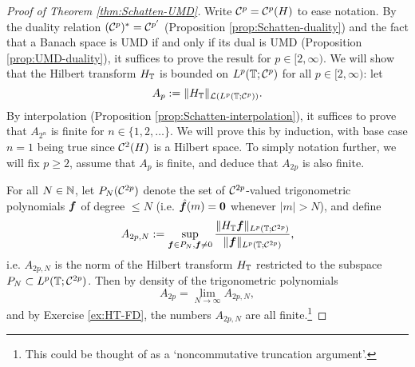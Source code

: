 \begin{proof}[Proof of Theorem \ref{thm:Schatten-UMD}]
  Write $\mathcal{C}^{p} = \mathcal{C}^{p}(H)$ to ease notation.
  By the duality relation $(\mathcal{C}^{p})^* = \mathcal{C}^{p'}$ (Proposition \ref{prop:Schatten-duality}) and the fact that a Banach space is UMD if and only if its dual is UMD (Proposition \ref{prop:UMD-duality}), it suffices to prove the result for $p \in [2,\infty)$.
  We will show that the Hilbert transform $H_{\mathbb{T}}$ is bounded on $L^p(\mathbb{T};\mathcal{C}^{p})$ for all $p \in [2,\infty)$: let
  \begin{equation*}
    A_{p} := \|H_{\mathbb{T}}\|_{\mathcal{L}(L^p(\mathbb{T};\mathcal{C}^{p}))}.
  \end{equation*}
  By interpolation (Proposition \ref{prop:Schatten-interpolation}), it suffices to prove that $A_{2^{n}}$ is finite for $n \in \{1,2,\ldots\}$.
  We will prove this by induction, with base case $n=1$ being true since $\mathcal{C}^{2}(H)$ is a Hilbert space.
  To simply notation further, we will fix $p \geq 2$, assume that $A_{p}$ is finite, and deduce that $A_{2p}$ is also finite.

  For all $N \in \mathbb{N}$, let $P_{N}(\mathcal{C}^{2p})$ denote the set of $\mathcal{C}^{2p}$-valued trigonometric polynomials $\bm{f}$ of degree $\leq N$ (i.e. $\hat{\bm{f}}(m) = \bm{0}$ whenever $|m| > N$), and define
  \begin{equation*}
    A_{2p,N} := \sup_{\bm{f} \in P_{N}, \bm{f} \neq 0} \frac{\|H_{\mathbb{T}} \bm{f}\|_{L^p(\mathbb{T};\mathcal{C}^{2p})}}{\|\bm{f}\|_{L^p(\mathbb{T};\mathcal{C}^{2p})}},
  \end{equation*}
  i.e. $A_{2p,N}$ is the norm of the Hilbert transform $H_{\mathbb{T}}$ restricted to the subspace $P_{N} \subset L^p(\mathbb{T};\mathcal{C}^{2p})$.
  Then by density of the trigonometric polynomials
  \begin{equation*}
    A_{2p} = \lim_{N \to \infty} A_{2p,N},
  \end{equation*}
  and by Exercise \ref{ex:HT-FD}, the numbers $A_{2p,N}$ are all finite.\footnote{This could be thought of as a `noncommutative truncation argument'.}


\end{proof}
